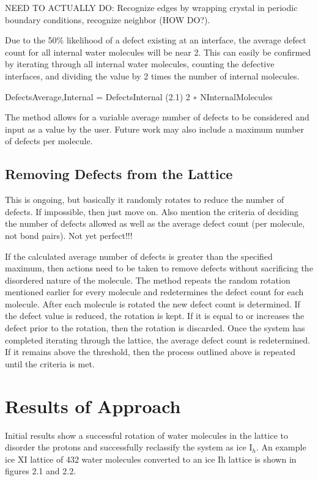 NEED TO ACTUALLY DO: Recognize edges by wrapping crystal in periodic boundary conditions, recognize neighbor (HOW DO?).

Due to the 50\% likelihood of a defect existing at an interface, the average defect count for all internal water molecules will be near 2. 
This can easily be confirmed by iterating through all internal water molecules, counting the defective interfaces, and dividing the value by 2 times the number of internal molecules.

DefectsAverage,Internal = DefectsInternal (2.1) 2 ∗ NInternalMolecules

The method allows for a variable average number of defects to be considered and input as a value by the user. Future work may also include a maximum number of defects per molecule.

\subsection{Removing Defects from the Lattice}
This is ongoing, but basically it randomly rotates to reduce the number of defects. 
If impossible, then just move on. 
Also mention the criteria of deciding the number of defects allowed as well as the average defect count (per molecule, not bond pairs). 
Not yet perfect!!!

If the calculated average number of defects is greater than the specified maximum, then actions need to be taken to remove defects without sacrificing the disordered nature of the molecule. 
The method repeats the random rotation mentioned earlier for every molecule and redetermines the defect count for each molecule. 
After each molecule is rotated the new defect count is determined. 
If the defect value is reduced, the rotation is kept. 
If it is equal to or increases the defect prior to the rotation, then the rotation is discarded. 
Once the system has completed iterating through the lattice, the average defect count is redetermined. 
If it remains above the threshold, then the process outlined above is repeated until the criteria is met.

\section{Results of Approach}
Initial results show a successful rotation of water molecules in the lattice to disorder the protons and successfully reclassify the system as ice I$_{h}$. 
An example ice XI lattice of 432 water molecules converted to an ice Ih lattice is shown in figures 2.1 and 2.2.

